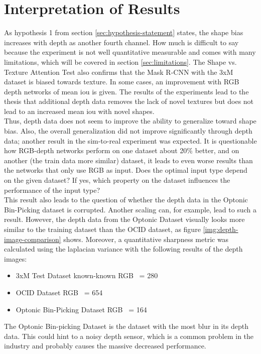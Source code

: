 	\section{Interpretation of Results}
	\label{sec:interpretation-of-results}
		As hypothesis 1 from section \ref{sec:hypothesis-statement} states, the shape bias increases with depth as another fourth channel. How much is difficult to say because the experiment is not well quantitative measurable and comes with many limitations, which will be covered in section \ref{sec:limitations}. The Shape vs. Texture Attention Test also confirms that the Mask R-CNN with the 3xM dataset is biased towards texture. In some cases, an improvement with RGB depth networks of mean \ac{iou} is given. The results of the experiments lead to the thesis that additional depth data removes the lack of novel textures but does not lead to an increased mean \ac{iou} with novel shapes.\\
		Thus, depth data does not seem to improve the ability to generalize toward shape bias. Also, the overall generalization did not improve significantly through depth data; another result in the sim-to-real experiment was expected. It is questionable how RGB-depth networks perform on one dataset about 20\% better, and on another (the train data more similar) dataset, it leads to even worse results than the networks that only use RGB as input.
		\clearpage
		Does the optimal input type depend on the given dataset? If yes, which property on the dataset influences the performance of the input type?\\
		This result also leads to the question of whether the depth data in the Optonic Bin-Picking dataset is corrupted. Another scaling can, for example, lead to such a result. However, the depth data from the Optonic Dataset visually looks more similar to the training dataset than the OCID dataset, as figure \ref{img:depth-image-comparison} shows. Moreover, a quantitative sharpness metric was calculated using the laplacian variance with the following results of the depth images:
		\begin{itemize}
			\item 3xM Test Dataset known-known RGB ~= 280
			\item OCID Dataset RGB ~= 654
			\item Optonic Bin-Picking Dataset RGB ~= 164
		\end{itemize}
		The Optonic Bin-picking Dataset is the dataset with the most blur in its depth data. This could hint to a noisy depth sensor, which is a common problem in the industry \cite{Raj2023} and probably causes the massive decreased performance.\\
